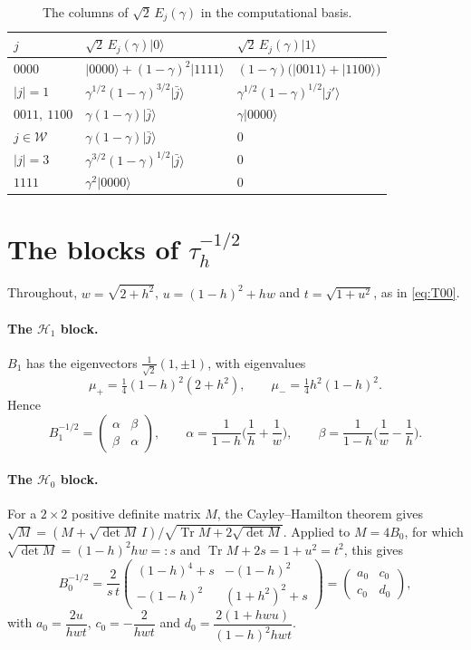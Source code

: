 \documentclass[11pt,a4paper]{article}
\theoremstyle{plain}
\newcommand{\ket}[1]{\lvert #1\rangle}
\newcommand{\cW}{\mathcal{W}}
\newcommand{\cH}{\mathcal{H}}
\newcommand{\wt}[1]{\lvert #1\rvert}
\DeclareMathOperator{\Tr}{Tr}
\begin{document}
\begin{table}[ht]
\centering
\renewcommand{\arraystretch}{1.3}
\begin{tabular}{@{}lll@{}}
\toprule
$j$ & $\sqrt2\,E_j(\gamma)\ket0$ & $\sqrt2\,E_j(\gamma)\ket1$\\
\midrule
$0000$ & $\ket{0000}+(1-\gamma)^2\ket{1111}$ & $(1-\gamma)\big(\ket{0011}+\ket{1100}\big)$\\
$\wt{j}=1$ & $\gamma^{1/2}(1-\gamma)^{3/2}\ket{\bar j}$ & $\gamma^{1/2}(1-\gamma)^{1/2}\ket{j'}$\\
$0011,\ 1100$ & $\gamma(1-\gamma)\ket{\bar j}$ & $\gamma\ket{0000}$\\
$j\in\cW$ & $\gamma(1-\gamma)\ket{\bar j}$ & $0$\\
$\wt{j}=3$ & $\gamma^{3/2}(1-\gamma)^{1/2}\ket{\bar j}$ & $0$\\
$1111$ & $\gamma^2\ket{0000}$ & $0$\\
\bottomrule
\end{tabular}
\caption{The columns of $\sqrt2\,E_j(\gamma)$ in the computational basis.}
\label{tab:columns}
\end{table}

\section{The blocks of \texorpdfstring{$\tau_h^{-1/2}$}{the inverse square root}}\label{app:tau}

Throughout, $w=\sqrt{2+h^2}$, $u=(1-h)^2+hw$ and $t=\sqrt{1+u^2}$, as in \eqref{eq:T00}.

\paragraph{The $\cH_1$ block.} $B_1$ has the eigenvectors $\frac1{\sqrt2}(1,\pm1)$, with eigenvalues
\[
\mu_+=\tfrac14(1-h)^2(2+h^2),\qquad \mu_-=\tfrac14h^2(1-h)^2 .
\]
Hence
\[
B_1^{-1/2}=\begin{pmatrix}\alpha&\beta\\\beta&\alpha\end{pmatrix},\qquad \alpha=\frac1{1-h}\Big(\frac1h+\frac1w\Big),\qquad \beta=\frac1{1-h}\Big(\frac1w-\frac1h\Big).
\]

\paragraph{The $\cH_0$ block.} For a $2\times2$ positive definite matrix $M$, the Cayley--Hamilton theorem gives $\sqrt M=(M+\sqrt{\det M}\,I)/\sqrt{\Tr M+2\sqrt{\det M}}$. Applied to $M=4B_0$, for which $\sqrt{\det M}=(1-h)^2hw=:s$ and $\Tr M+2s=1+u^2=t^2$, this gives
\[
B_0^{-1/2}=\frac2{s\,t}\begin{pmatrix}(1-h)^4+s&-(1-h)^2\\-(1-h)^2&(1+h^2)^2+s\end{pmatrix}=\begin{pmatrix}a_0&c_0\\c_0&d_0\end{pmatrix},
\]
with $a_0=\dfrac{2u}{hwt}$, $c_0=-\dfrac2{hwt}$ and $d_0=\dfrac{2(1+hwu)}{(1-h)^2hwt}$.
\end{document}
